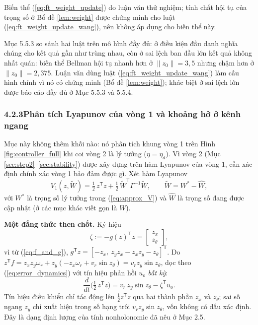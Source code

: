 \documentclass[12pt,a4paper]{article}
\makeatletter
\newcommand{\seclabel}[2]{\phantomsection\protected@edef\@currentlabel{#2}\label{#1}}
\newcommand{\T}{\mathsf{T}}
\makeatother
\begin{document}
Biến thể (\ref{eq:ft_weight_update}) do luận văn thử nghiệm; tính chất hội tụ của trọng số ở Bổ đề \ref{lem:weight} được chứng minh cho luật (\ref{eq:ft_weight_update_wang}), nên không áp dụng cho biến thể này.

Mục 5.5.3 so sánh hai luật trên mô hình đầy đủ: ở điều kiện đầu danh nghĩa chúng cho kết quả gần như trùng nhau, còn ở sai lệch ban đầu lớn kết quả không nhất quán: biến thể Bellman hội tụ nhanh hơn ở $\|z_0\| = 3{,}5$ nhưng chậm hơn ở $\|z_0\| = 2{,}375$. Luận văn dùng luật (\ref{eq:ft_weight_update_wang}) làm cấu hình chính vì nó có chứng minh (Bổ đề \ref{lem:weight}); khác biệt ở sai lệch lớn được báo cáo đầy đủ ở Mục 5.5.3 và 5.5.4.

\subsubsection*{4.2.3\quad Phân tích Lyapunov của vòng 1 và khoảng hở ở kênh ngang}
\seclabel{sec:wang_gap}{4.2.3}

Mục này không thêm khối nào: nó phân tích khung vòng 1 trên Hình \ref{fig:controller_full} khi coi vòng 2 là lý tưởng ($\eta = \eta_d$). Vì vòng 2 (Mục \ref{sec:step2}--\ref{sec:stability}) được xây dựng trên hàm Lyapunov của vòng 1, cần xác định chính xác vòng 1 bảo đảm được gì. Xét hàm Lyapunov
\begin{equation}\label{eq:V1}
    V_1(z, \tilde W) = \tfrac12\, z^\T z + \tfrac12\, \tilde W^\T \Gamma^{-1} \tilde W, \qquad \tilde W = W^* - \hat W,
\end{equation}
với $W^*$ là trọng số lý tưởng trong (\ref{eq:approx_V}) và $\hat W$ là trọng số đang được cập nhật (ở các mục khác viết gọn là $W$).

\textbf{Một đẳng thức then chốt.} Ký hiệu
\begin{equation}\label{eq:zeta}
    \zeta := -g(z)^\T z = \begin{bmatrix} z_x \\ z_\theta \end{bmatrix},
\end{equation}
vì từ (\ref{eq:f_and_g}), $g^\T z = [-z_x,\ z_y z_x - z_x z_y - z_\theta]^\T$. Do $z^\T f = z_x z_y\omega_r + z_y(-z_x\omega_r + v_r\sin z_\theta) = v_r z_y\sin z_\theta$, dọc theo (\ref{eq:error_dynamics}) với tín hiệu phản hồi $u_o$ \textit{bất kỳ}:
\begin{equation}\label{eq:V1z_identity}
    \frac{d}{dt}\Big(\tfrac12\, z^\T z\Big) = v_r\, z_y \sin z_\theta - \zeta^\T u_o .
\end{equation}
Tín hiệu điều khiển chỉ tác động lên $\frac12 z^\T z$ qua hai thành phần $z_x$ và $z_\theta$; sai số ngang $z_y$ chỉ xuất hiện trong số hạng trôi $v_r z_y\sin z_\theta$, vốn không có dấu xác định. Đây là dạng định lượng của tính nonholonomic đã nêu ở Mục 2.5.
\end{document}
